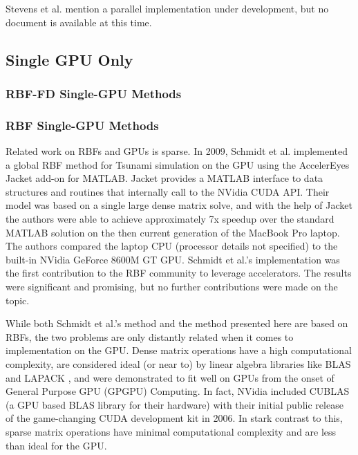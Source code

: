 \documentclass[11pt]{report}
\begin{document}
Stevens et al. \cite{Stevens2009a} mention a parallel implementation under development, but no document is available at this time. 



\subsection{Single GPU Only} 





\subsubsection{RBF-FD Single-GPU Methods} 

\subsubsection{RBF Single-GPU Methods}

Related work on RBFs and GPUs is sparse. In 2009, Schmidt et al. \cite{Schmidt2009a, Schmidt2009b} implemented a global RBF method for Tsunami simulation on the GPU using the AccelerEyes Jacket \cite{JacketGuide2009} add-on for MATLAB. Jacket provides a MATLAB interface to data structures and routines that internally call to the NVidia CUDA API. Their model was based on a single large dense matrix solve, and with the help of Jacket the authors were able to achieve approximately 7x speedup over the standard MATLAB solution on the then current generation of the MacBook Pro laptop. The authors compared the laptop CPU (processor details not specified) to the built-in NVidia GeForce 8600M GT GPU. Schmidt et al.'s implementation was the first contribution to the RBF community to leverage accelerators. The results were significant and promising, but no further contributions were made on the topic. 

While both Schmidt et al.'s method and the method presented here are based on RBFs, the two problems are only distantly related when it comes to implementation on the GPU. Dense matrix operations have a high computational complexity, are considered ideal (or near to) by linear algebra libraries like BLAS \cite{BLAS} and LAPACK \cite{Lapack1999}, and were demonstrated to fit well on GPUs from the onset of General Purpose GPU (GPGPU) Computing. In fact, NVidia included CUBLAS \cite{CudaToolkitDoc} (a GPU based BLAS library for their hardware) with their initial public release of the game-changing CUDA development kit in 2006. In stark contrast to this, sparse matrix operations have minimal computational complexity and are less than ideal for the GPU.
\end{document}
